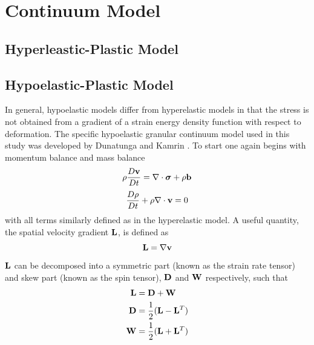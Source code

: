 \chapter{Continuum Model}

\section{Hyperleastic-Plastic Model} \label{hyperelastic_model}

\section{Hypoelastic-Plastic Model} \label{hypoelastic_model}
In general, hypoelastic models differ from hyperelastic models in that the stress is not obtained from a gradient of a strain energy density function with respect to deformation. The specific hypoelastic granular continuum model used in this study was developed by Dunatunga and Kamrin \cite{Dunatunga:2015:Continuum}. To start one again begins with momentum balance and mass balance
\begin{equation}
\rho\frac{D\bold{v}}{Dt} = \nabla\cdot\bm{\sigma} + \rho\bold{b} \label{mom_bal}
\end{equation}
\begin{equation}
\frac{D\rho}{Dt} + \rho\nabla\cdot\bold{v}=0\label{mass_bal}
\end{equation}
with all terms similarly defined as in the hyperelastic model. A useful quantity, the spatial velocity gradient $\bold{L}$, is defined as
\begin{equation}
\bold{L}=\nabla\bold{v} \label{L_def}
\end{equation}
$\bold{L}$ can be decomposed into a symmetric part (known as the strain rate tensor) and skew part (known as the spin tensor), $\bold{D}$ and $\bold{W}$ respectively, such that
\begin{subequations}
\begin{align}
\bold{L}&=\bold{D}+\bold{W} \label{L_split} \\
\bold{D}&=\frac{1}{2}(\bold{L}-\bold{L}^T) \label{D_def} \\
\bold{W}&=\frac{1}{2}(\bold{L}+\bold{L}^T) \label{W_def}
\end{align}
\end{subequations}

